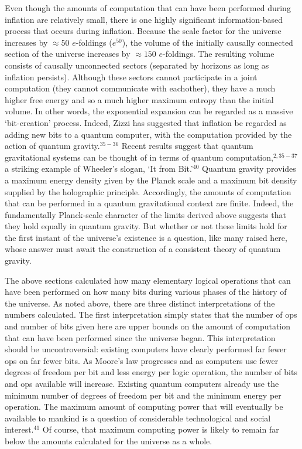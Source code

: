 Even though the amounts of computation that can have been performed
during inflation are relatively small, there is one highly significant
information-based process that occurs during inflation.  Because the
scale factor for the universe increases by $\approx 50$ $e$-foldings
($e^{50}$), the volume of the initially causally connected section
of the universe increases by $\approx 150$ $e$-foldings.  The resulting
volume consists of causally unconnected sectors (separated by horizons
as long as inflation persists).  Although these sectors cannot participate
in a joint computation (they cannot communicate with eachother), they
have a much higher free energy and so a much higher maximum entropy 
than the initial volume.  In other
words, the exponential expansion can be regarded as a massive 
`bit-creation' process. Indeed, Zizzi has suggested that inflation be 
regarded as adding new bits to a quantum computer, with the computation
provided by the action of quantum gravity.$^{35-36}$ Recent results suggest
that quantum gravitational systems can be thought of in terms of
quantum computation,$^{2, 35-37}$ a striking example of Wheeler's
slogan, `It from Bit.'$^{40}$ Quantum gravity provides a
maximum energy density given by the Planck scale and a maximum
bit density supplied by the holographic principle.  Accordingly,
the amounts of computation that can be performed in a quantum
gravitational context are finite.  Indeed, the fundamentally Planck-scale
character of the limits derived above suggests that they hold equally
in quantum gravity.  But whether or not these limits hold for
the first instant of the universe's existence
is a question, like many raised here,
whose answer must await the construction of a consistent theory of quantum 
gravity.  

\bigskip{}

The above sections calculated how many elementary logical
operations that can have been performed on how many bits during
various phases of the history of the universe.  As noted above,
there are three distinct interpretations of the numbers calculated.
The first interpretation simply states that the number of ops and
number of bits given here are upper bounds on the amount of computation
that can have been performed since the universe began.  This interpretation
should be uncontroversial: existing computers have clearly performed far
fewer ops on far fewer bits.  As Moore's law progresses and as computers use 
fewer degrees of freedom per bit and less energy per logic operation,  
the number of bits and ops available will increase.  Existing quantum
computers already use the minimum number of degrees of freedom per
bit and the minimum energy per operation.  The maximum amount of
computing power that will eventually be available to mankind is a
question of considerable technological and social interest.$^{41}$
Of course, that maximum computing power is likely to remain far below
the amounts calculated for the universe as a whole.

